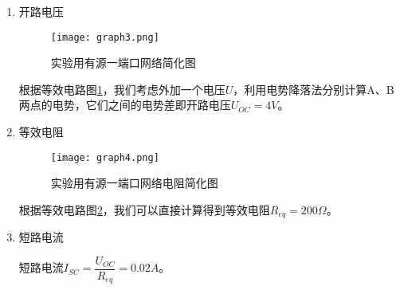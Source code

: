 \documentclass[dvipsnames, svgnames,a4paper,11pt]{article}
\begin{document}
	
	\begin{enumerate}
		\item 开路电压
		
		\begin{figure}[htbp]
			\centering
			\texttt{[image: graph3.png]}
			\caption{实验用有源一端口网络简化图}
			\label{fig:graph3}
		\end{figure}

		根据等效电路图\cref{fig:graph3}，我们考虑外加一个电压$U$，利用电势降落法分别计算A、B两点的电势，它们之间的电势差即开路电压$U_{OC}=4V$。
		
		\item 等效电阻
		
		\begin{figure}[htbp]
			\centering
			\texttt{[image: graph4.png]}
			\caption{实验用有源一端口网络电阻简化图}
			\label{fig:graph4}
		\end{figure}

		根据等效电路图\cref{fig:graph4}，我们可以直接计算得到等效电阻$R_{eq}=200\Omega$。
		
		\item 短路电流
		
		短路电流$I_{SC}=\dfrac{U_{OC}}{R_{eq}}=0.02A$。
	\end{enumerate}
	
\end{document}
